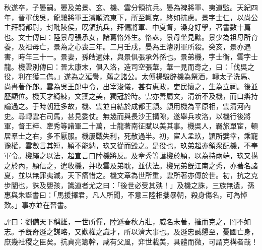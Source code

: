 \begin{pinyinscope}
秋遂卒，子晏嗣。晏及弟景、玄、機、雲分領抗兵。晏為裨將軍、夷道監。天紀四年，晉軍伐吳，龍驤將軍王濬順流東下，所至輒克，終如抗慮。景字士仁，以尚公主拜騎都尉，封毗陵侯，旣領抗兵，拜偏將軍、中夏督，澡身好學，著書數十篇也。文士傳曰：陸景母張承女，諸葛恪外生。恪誅，景母坐見黜。景少為祖母所育養，及祖母亡，景為之心喪三年。二月壬戌，晏為王濬別軍所殺。癸亥，景亦遇害，時年三十一。景妻，孫皓適妹，與景俱張承外孫也。景弟機，字士衡，雲字士龍。機雲別傳曰：晉太康末，俱入洛，造司空張華，華一見而奇之，曰：「伐吳之役，利在獲二儁。」遂為之延譽，薦之諸公。太傅楊駿辟機為祭酒，轉太子洗馬、尚書著作郎。雲為吳王郎中令，出宰浚儀，甚有惠政，吏民懷之，生為立祠。後並歷顯位。機天才綺練，文藻之美，獨冠於時。雲亦善屬文，清新不及機，而口辯持論過之。于時朝廷多故，機、雲並自結於成都王頴。頴用機為平原相，雲清河內史。尋轉雲右司馬，甚見委仗。無幾而與長沙王搆隙，遂舉兵攻洛，以機行後將軍，督王粹、牽秀等諸軍二十萬，士龍著南征賦以美其事。機吳人，羇旅單宦，頓居羣士之右，多不厭服。機屢戰失利，死散過半。初，宦人孟玖，頴所嬖幸，乘寵豫權，雲數言其短，頴不能納，玖又從而毀之。是役也，玖弟超亦領衆配機，不奉軍令。機繩之以法，超宣言曰陸機將反。及牽秀等譖機於頴，以為持兩端，玖又搆之於內，頴信之，遣收機，并收雲及弟耽，並伏法。機兄弟旣江南之秀，亦著名諸夏，並以無罪夷滅，天下痛惜之。機文章為世所重，雲所著亦傳於世。初，抗之克步闡也，誅及嬰孩，識道者尤之曰：「後世必受其殃！」及機之誅，三族無遺，孫惠與朱誕書曰：「馬援擇君，凡人所聞，不意三陸相攜暴朝，殺身傷名，可為悼歎。」事亦並在晉書。

評曰：劉備天下稱雄，一世所憚，陸遜春秋方壯，威名未著，摧而克之，罔不如志。予旣奇遜之謀略，又歎權之識才，所以濟大事也。及遜忠誠懇至，憂國亡身，庶幾社稷之臣矣。抗貞亮籌幹，咸有父風，弈世載美，具體而微，可謂克構者哉！


\end{pinyinscope}
